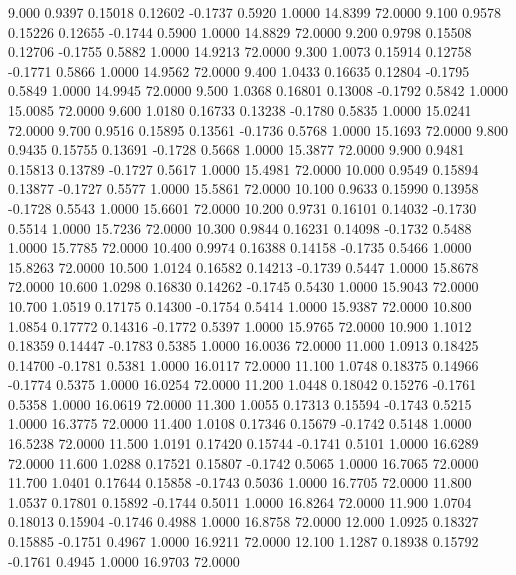    9.000   0.9397   0.15018   0.12602  -0.1737   0.5920   1.0000  14.8399  72.0000
   9.100   0.9578   0.15226   0.12655  -0.1744   0.5900   1.0000  14.8829  72.0000
   9.200   0.9798   0.15508   0.12706  -0.1755   0.5882   1.0000  14.9213  72.0000
   9.300   1.0073   0.15914   0.12758  -0.1771   0.5866   1.0000  14.9562  72.0000
   9.400   1.0433   0.16635   0.12804  -0.1795   0.5849   1.0000  14.9945  72.0000
   9.500   1.0368   0.16801   0.13008  -0.1792   0.5842   1.0000  15.0085  72.0000
   9.600   1.0180   0.16733   0.13238  -0.1780   0.5835   1.0000  15.0241  72.0000
   9.700   0.9516   0.15895   0.13561  -0.1736   0.5768   1.0000  15.1693  72.0000
   9.800   0.9435   0.15755   0.13691  -0.1728   0.5668   1.0000  15.3877  72.0000
   9.900   0.9481   0.15813   0.13789  -0.1727   0.5617   1.0000  15.4981  72.0000
  10.000   0.9549   0.15894   0.13877  -0.1727   0.5577   1.0000  15.5861  72.0000
  10.100   0.9633   0.15990   0.13958  -0.1728   0.5543   1.0000  15.6601  72.0000
  10.200   0.9731   0.16101   0.14032  -0.1730   0.5514   1.0000  15.7236  72.0000
  10.300   0.9844   0.16231   0.14098  -0.1732   0.5488   1.0000  15.7785  72.0000
  10.400   0.9974   0.16388   0.14158  -0.1735   0.5466   1.0000  15.8263  72.0000
  10.500   1.0124   0.16582   0.14213  -0.1739   0.5447   1.0000  15.8678  72.0000
  10.600   1.0298   0.16830   0.14262  -0.1745   0.5430   1.0000  15.9043  72.0000
  10.700   1.0519   0.17175   0.14300  -0.1754   0.5414   1.0000  15.9387  72.0000
  10.800   1.0854   0.17772   0.14316  -0.1772   0.5397   1.0000  15.9765  72.0000
  10.900   1.1012   0.18359   0.14447  -0.1783   0.5385   1.0000  16.0036  72.0000
  11.000   1.0913   0.18425   0.14700  -0.1781   0.5381   1.0000  16.0117  72.0000
  11.100   1.0748   0.18375   0.14966  -0.1774   0.5375   1.0000  16.0254  72.0000
  11.200   1.0448   0.18042   0.15276  -0.1761   0.5358   1.0000  16.0619  72.0000
  11.300   1.0055   0.17313   0.15594  -0.1743   0.5215   1.0000  16.3775  72.0000
  11.400   1.0108   0.17346   0.15679  -0.1742   0.5148   1.0000  16.5238  72.0000
  11.500   1.0191   0.17420   0.15744  -0.1741   0.5101   1.0000  16.6289  72.0000
  11.600   1.0288   0.17521   0.15807  -0.1742   0.5065   1.0000  16.7065  72.0000
  11.700   1.0401   0.17644   0.15858  -0.1743   0.5036   1.0000  16.7705  72.0000
  11.800   1.0537   0.17801   0.15892  -0.1744   0.5011   1.0000  16.8264  72.0000
  11.900   1.0704   0.18013   0.15904  -0.1746   0.4988   1.0000  16.8758  72.0000
  12.000   1.0925   0.18327   0.15885  -0.1751   0.4967   1.0000  16.9211  72.0000
  12.100   1.1287   0.18938   0.15792  -0.1761   0.4945   1.0000  16.9703  72.0000
